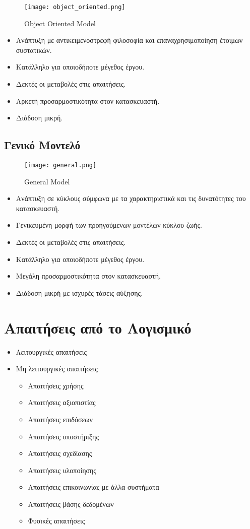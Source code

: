 \begin{figure}[H]
	\centering
	\texttt{[image: object\_oriented.png]}
	\caption{Object Oriented Model}
\end{figure}

\begin{itemize}
	\item	Ανάπτυξη με αντικειμενοστρεφή φιλοσοφία και επαναχρησιμοποίηση έτοιμων συστατικών.
	\item	Κατάλληλο για οποιοδήποτε μέγεθος έργου.
	\item	Δεκτές οι μεταβολές στις απαιτήσεις.
	\item	Αρκετή προσαρμοστικότητα στον κατασκευαστή.
	\item	Διάδοση μικρή.
\end{itemize}

\subsection{Γενικό Μοντελό}

\begin{figure}[H]
	\centering
	\texttt{[image: general.png]}
	\caption{General Model}
\end{figure}

\begin{itemize}
	\item	Ανάπτυξη σε κύκλους σύμφωνα με τα χαρακτηριστικά και τις δυνατότητες του κατασκευαστή.
	\item	Γενικευμένη μορφή των προηγούμενων μοντέλων κύκλου ζωής.
	\item	Δεκτές οι μεταβολές στις απαιτήσεις.
	\item	Κατάλληλο για οποιοδήποτε μέγεθος έργου.
	\item	Μεγάλη προσαρμοστικότητα στον κατασκευαστή.
	\item	Διάδοση μικρή με ισχυρές τάσεις αύξησης.
\end{itemize}


\section{Απαιτήσεις από το Λογισμικό}

\begin{itemize}
	\item	Λειτουργικές απαιτήσεις
	\item	Μη λειτουργικές απαιτήσεις
		\begin{itemize}
			\item	Απαιτήσεις χρήσης
			\item	Απαιτήσεις αξιοπιστίας
			\item	Απαιτήσεις επιδόσεων
			\item	Απαιτήσεις υποστήριξης
			\item	Απαιτήσεις σχεδίασης
			\item	Απαιτήσεις υλοποίησης
			\item	Απαιτήσεις επικοινωνίας με άλλα συστήματα
			\item	Απαιτήσεις βάσης δεδομένων
			\item	Φυσικές απαιτήσεις
		\end{itemize}
\end{itemize}

